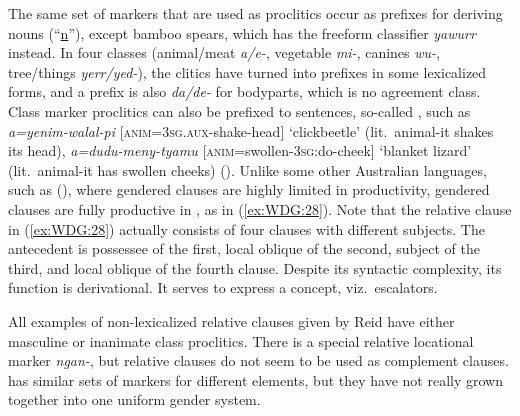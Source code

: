\documentclass[output=collectionpaper]{langsci/langscibook}
\begin{document}
 
The same set of markers that are used as proclitics occur as prefixes for deriving nouns (``\uline{n}''), except bamboo spears, which has the freeform classifier \textit{yawurr} instead. In four classes (animal/meat \textit{a/e-}, vegetable \textit{mi-}, canines \textit{wu-}, tree/things \textit{yerr/yed-}), the clitics have turned into prefixes in some lexicalized forms, and a prefix is also \textit{da/de-} for bodyparts, which is no agreement class. Class marker proclitics can also be prefixed to sentences, so-called , such as \textit{a=yenim-walal-pi} [\textsc{anim=3sg.aux}-shake-head] `clickbeetle' (lit.\ animal-it shakes its head), \textit{a=dudu-meny-tyamu} [\textsc{anim}=swollen-3\textsc{sg}:do-cheek] `blanket lizard' (lit.\ animal-it has swollen cheeks) (\citealt[210]{Reid1997}). Unlike some other Australian languages, such as  (), where gendered clauses are highly limited in productivity, gendered clauses are fully productive in , as in (\ref{ex:WDG:28}). Note that the relative clause in (\ref{ex:WDG:28}) actually consists of four clauses with different subjects. The antecedent is possessee of the first, local oblique of the second, subject of the third, and local oblique of the fourth clause. Despite its syntactic complexity, its function is derivational. It serves to express a concept, viz.\ escalators.

%

All examples of non-lexicalized relative clauses given by Reid have either masculine or inanimate class proclitics. There is a special relative locational marker \textit{ngan-}, but relative clauses do not seem to be used as complement clauses.  has similar sets of markers for different elements, but they have not really grown together into one uniform gender system.
\end{document}
